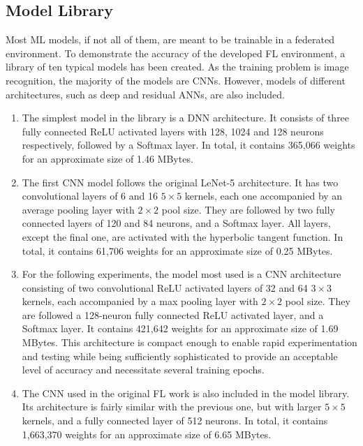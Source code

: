 \subsection{Model Library}
Most ML models, if not all of them, are meant to be trainable in a federated environment. To demonstrate the accuracy of the developed FL environment, a library of ten typical models has been created. As the training problem is image recognition, the majority of the models are CNNs. However, models of different architectures, such as deep and residual ANNs, are also included.

\begin{enumerate}
    \item The simplest model in the library is a DNN architecture. It consists of three fully connected ReLU activated layers with 128, 1024 and 128 neurons respectively, followed by a Softmax layer. In total, it contains 365,066 weights for an approximate size of 1.46 MBytes.
    
    \item The first CNN model follows the original LeNet-5 architecture. It has two convolutional layers of 6 and 16 \(5\times5\) kernels, each one accompanied by an average pooling layer with \(2\times2\) pool size. They are followed by two fully connected layers of 120 and 84 neurons, and a Softmax layer. All layers, except the final one, are activated with the hyperbolic tangent function. In total, it contains 61,706 weights for an approximate size of 0.25 MBytes.
    
    \item For the following experiments, the model most used is a CNN architecture consisting of two convolutional ReLU activated layers of 32 and 64 \(3\times3\) kernels, each accompanied by a max pooling layer with \(2\times2\) pool size. They are followed a 128-neuron fully connected ReLU activated layer, and a Softmax layer. It contains 421,642 weights for an approximate size of 1.69 MBytes. This architecture is compact enough to enable rapid experimentation and testing while being sufficiently sophisticated to provide an acceptable level of accuracy and necessitate several training epochs.
    
    \item The CNN used in the original FL work \cite{FL-original-paper} is also included in the model library. Its architecture is fairly similar with the previous one, but with larger \(5\times5\) kernels, and a fully connected layer of 512 neurons. In total, it contains 1,663,370 weights for an approximate size of 6.65 MBytes.
    

\end{enumerate}

